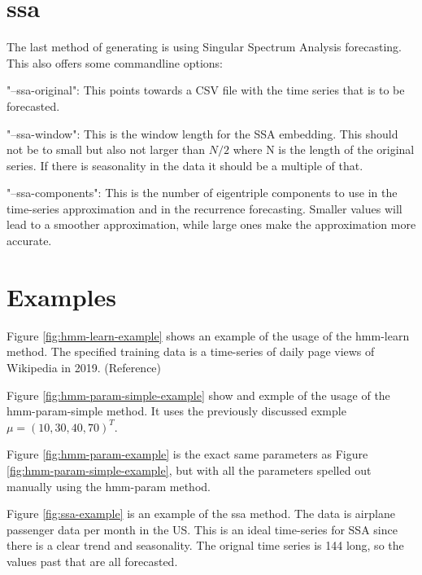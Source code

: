 \section{ssa}

The last method of generating is using Singular Spectrum Analysis forecasting. This also offers some commandline options: 

"--ssa-original": This points towards a CSV file with the time series that is to be forecasted. 

"--ssa-window": This is the window length for the SSA embedding. This should not be to small but also not larger than $N/2$ where N is the length of the original series. If there is seasonality in the data it should be a multiple of that. 

"--ssa-components": This is the number of eigentriple components to use in the time-series approximation and in the recurrence forecasting. Smaller values will lead to a smoother approximation, while large ones make the approximation more accurate. 

\section{Examples}

Figure \ref{fig:hmm-learn-example} shows an example of the usage of the hmm-learn method. The specified training data is a time-series of daily page views of Wikipedia in 2019. (Reference)

Figure \ref{fig:hmm-param-simple-example} show and exmple of the usage of the hmm-param-simple method. It uses the previously discussed exmple $\mu = (10, 30, 40, 70)^T$. 

Figure \ref{fig:hmm-param-example} is the exact same parameters as Figure \ref{fig:hmm-param-simple-example}, but with all the parameters spelled out manually using the hmm-param method. 

Figure \ref{fig:ssa-example} is an example of the ssa method. The data is airplane passenger data per month in the US. This is an ideal time-series for SSA since there is a clear trend and seasonality. The orignal time series is 144 long, so the values past that are all forecasted.

